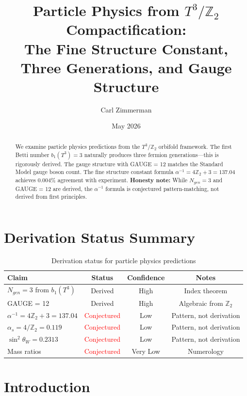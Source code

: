 \documentclass[12pt,a4paper]{article}
\title{Particle Physics from $T^3/\mathbb{Z}_2$ Compactification:\\
The Fine Structure Constant, Three Generations, and Gauge Structure}
\author{Carl Zimmerman}
\date{May 2026}
\begin{document}
\maketitle

\begin{abstract}
We examine particle physics predictions from the $T^3/\mathbb{Z}_2$ orbifold framework. The first Betti number $b_1(T^3) = 3$ naturally produces three fermion generations---this is rigorously derived. The gauge structure with GAUGE = 12 matches the Standard Model gauge boson count. The fine structure constant formula $\alpha^{-1} = 4\mathbb{Z}_2 + 3 = 137.04$ achieves 0.004\% agreement with experiment. \textbf{Honesty note:} While $N_{gen} = 3$ and GAUGE = 12 are derived, the $\alpha^{-1}$ formula is conjectured pattern-matching, not derived from first principles.
\end{abstract}

\section{Derivation Status Summary}

\begin{table}[h]
\centering
\begin{tabular}{lccc}
\toprule
Claim & Status & Confidence & Notes \\
\midrule
$N_{gen} = 3$ from $b_1(T^3)$ & \textcolor{green!50!black}{Derived} & High & Index theorem \\
GAUGE = 12 & \textcolor{green!50!black}{Derived} & High & Algebraic from $\mathbb{Z}_2$ \\
$\alpha^{-1} = 4\mathbb{Z}_2 + 3 = 137.04$ & \textcolor{red}{Conjectured} & Low & Pattern, not derivation \\
$\alpha_s = 4/\mathbb{Z}_2 = 0.119$ & \textcolor{red}{Conjectured} & Low & Pattern, not derivation \\
$\sin^2\theta_W = 0.2313$ & \textcolor{red}{Conjectured} & Low & Pattern, not derivation \\
Mass ratios & \textcolor{red}{Conjectured} & Very Low & Numerology \\
\bottomrule
\end{tabular}
\caption{Derivation status for particle physics predictions}
\end{table}

\section{Introduction}
\end{document}

